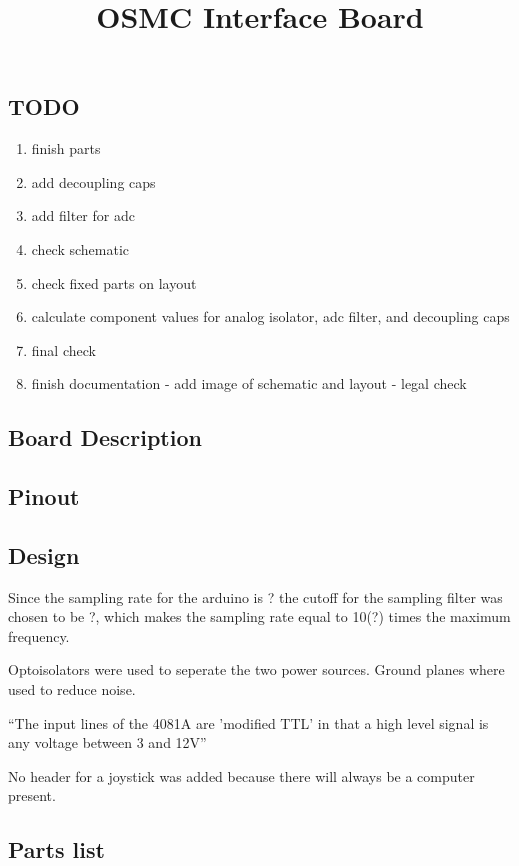 \documentclass[letterpaper,12pt,notitlepage]{report}
\begin{document}
\title{OSMC Interface Board}
\author{}
\date{}
\maketitle

\subsection{TODO}
\begin{enumerate}
 \item finish parts
 \item add decoupling caps
 \item add filter for adc
 \item check schematic
 \item check fixed parts on layout
 \item calculate component values for analog isolator, adc filter, and decoupling caps
 \item final check
 \item finish documentation - add image of schematic and layout - legal check
\end{enumerate}

\subsection{Board Description}

\subsection{Pinout}

\subsection{Design}

Since the sampling rate for the arduino is ? the cutoff for the sampling filter was chosen to be ?, which makes the sampling rate equal to 10(?) times the maximum frequency.

Optoisolators were used to seperate the two power sources.  Ground planes where used to reduce noise.

\textquotedblleft The input lines of the 4081A are 'modified TTL' in that a high level signal is any voltage between 3 and 12V\textquotedblright

No header for a joystick was added because there will always be a computer present.

\subsection{Parts list}
\end{document}
